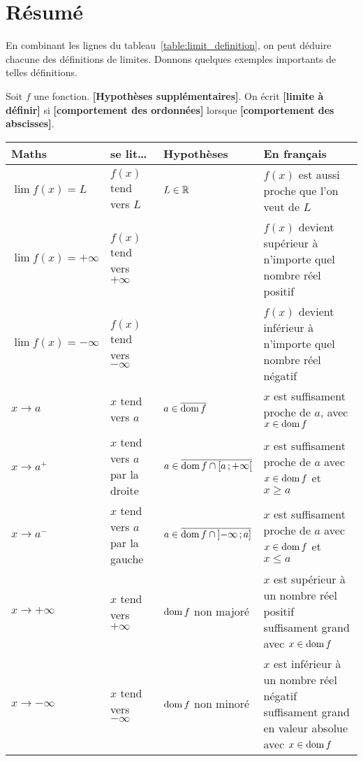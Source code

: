 \documentclass[main.tex]{subfiles}
\begin{document}
\section{Résumé}

En combinant les lignes du tableau~\ref{table:limit_definition},
on peut déduire chacune des définitions de limites.
Donnons quelques exemples importants de telles définitions.

\begin{definition}
    [Limite]

    Soit $f$ une fonction.
    \textbf{[Hypothèses supplémentaires]}.
    On écrit \textbf{[limite à définir]}
    si \textbf{[comportement des ordonnées]}
    lorsque \textbf{[comportement des abscisses]}.
\end{definition}

\begin{sidewaystable}
    \centering
    \caption{Tableau récapitulatif pour les définitions de limite}
    \label{table:limit_definition}
    \begin{tabular}
        {l l l l}
        \toprule
        Maths & se lit\dots & Hypothèses & En français \\ \midrule
        $\lim f(x) = L$ & $f(x)$ tend vers $L$ & $L \in \mathbb{R}$ & $f(x)$ est aussi proche que l'on veut de $L$ \\
        $\lim f(x) = +\infty$ & $f(x)$ tend vers $+\infty$ & & $f(x)$ devient supérieur à n'importe quel nombre réel positif\\
        $\lim f(x) = -\infty$ & $f(x)$ tend vers $-\infty$ & & $f(x)$ devient inférieur à n'importe quel nombre réel négatif\\
        $x \to a$ & $x$ tend vers $a$ & $a \in \overline{\operatorname{dom} f}$ & $x$ est suffisament proche de $a$, avec $x \in \operatorname{dom} f$\\
        $x \to a^+$ & $x$ tend vers $a$ par la droite & $a \in \overline{\operatorname{dom} f \cap \mathopen{[}a\,;+\infty\mathclose{[}}$ & $x$ est suffisament proche de $a$ avec $x \in \operatorname{dom} f$ et $x \geq a$\\
        $x \to a^-$ & $x$ tend vers $a$ par la gauche & $a \in \overline{\operatorname{dom} f \cap \mathopen{]}-\infty\,;a\mathclose{]}}$ & $x$ est suffisament proche de $a$ avec $x \in \operatorname{dom} f$ et $x \leq a$\\
        $x \to +\infty$ & $x$ tend vers $+\infty$ & $\operatorname{dom} f$ non majoré & $x$ est supérieur à un nombre réel positif suffisament grand avec $x \in \operatorname{dom} f$\\
        $x \to -\infty$ & $x$ tend vers $-\infty$ & $\operatorname{dom} f$ non minoré & $x$ est inférieur à un nombre réel négatif suffisament grand en valeur absolue avec $x \in \operatorname{dom} f$\\
        \bottomrule
    \end{tabular}
\end{sidewaystable}
\end{document}
